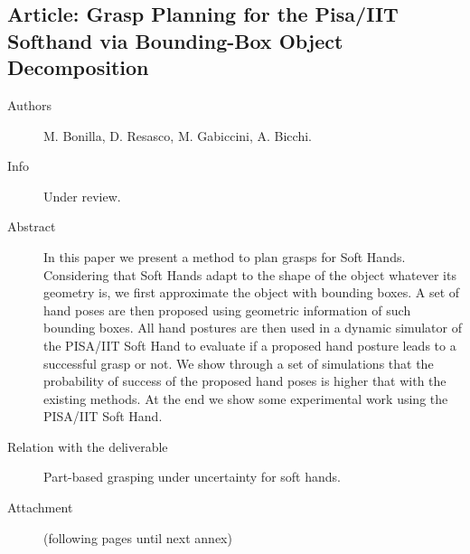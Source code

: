 \documentclass[a4paper,11pt,pdf]{pacmanreport}
\begin{document}
\subsection{Article: Grasp Planning for the Pisa/IIT Softhand via Bounding-Box Object Decomposition} \label{ann:boxedGrasp}
\begin{description}
    \item[Authors] M. Bonilla, D. Resasco, M. Gabiccini, A. Bicchi.
    \item[Info] Under review.
    \item[Abstract] In this paper we present a method to plan grasps for Soft Hands. Considering that Soft Hands adapt to the shape of the object whatever its geometry is, we first approximate the object with bounding boxes. A set of hand poses are then proposed using geometric information of such bounding boxes. All hand postures are then used in a dynamic simulator of the PISA/IIT Soft Hand to evaluate if a proposed hand posture leads to a successful grasp or not.
    We show through a set of simulations that the probability of success of the proposed hand poses is higher that with the existing methods.
    At the end we show some experimental work using the PISA/IIT Soft Hand.
    \item[Relation with the deliverable] Part-based grasping under uncertainty for soft hands.
    \item[Attachment] (following pages until next annex)
\end{description}
%
\end{document}

